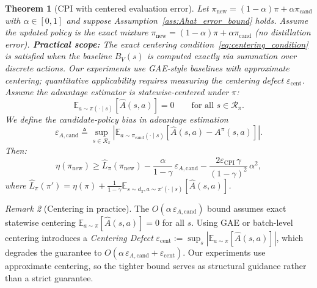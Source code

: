 \documentclass{article}
\theoremstyle{plain}
\newtheorem{theorem}{Theorem}[section]
\theoremstyle{definition}
\theoremstyle{remark}
\newtheorem{remark}[theorem]{Remark}
\newcommand{\E}{\mathbb{E}}
\begin{document}
\begin{theorem}[CPI with centered evaluation error]
\label{thm:monotone_with_error}
Let $\pi_{\mathrm{new}}=(1-\alpha)\pi+\alpha\pi_{\mathrm{cand}}$ with $\alpha\in[0,1]$ and suppose Assumption~\ref{ass:Ahat_error_bound} holds.
Assume the updated policy is the \emph{exact mixture} $\pi_{\mathrm{new}}=(1-\alpha)\pi+\alpha\pi_{\mathrm{cand}}$ (no distillation error).
\textbf{Practical scope:} The exact centering condition~\eqref{eq:centering_condition} is satisfied when the baseline $B_V(s)$ is computed exactly via summation over discrete actions. Our experiments use GAE-style baselines with approximate centering; quantitative applicability requires measuring the centering defect $\varepsilon_{\mathrm{cent}}$.
Assume the advantage estimator is \emph{statewise-centered under $\pi$}:
\begin{equation}
\E_{a\sim\pi(\cdot\mid s)}[\widehat A(s,a)] = 0
\qquad\text{for all } s\in\mathcal{R}_\pi.
\label{eq:centering_condition}
\end{equation}
We define the candidate-policy bias in advantage estimation
\begin{equation}
\varepsilon_{A,\mathrm{cand}}
\triangleq
\sup_{s \in \mathcal{R}_{\pi}}
\left|
\E_{a\sim\pi_{\mathrm{cand}}(\cdot\mid s)}\!\left[\widehat{A}(s,a)-A^\pi(s,a)\right]
\right|.
\label{eq:epsA0_def}
\end{equation}
Then:
\begin{equation}
\eta(\pi_{\mathrm{new}})
\ge
\widehat{L}_\pi(\pi_{\mathrm{new}})
-
\frac{\alpha}{1-\gamma}\,\varepsilon_{A,\mathrm{cand}}
-
\frac{2\varepsilon_{\mathrm{CPI}}\,\gamma}{(1-\gamma)^2}\,\alpha^2,
\label{eq:main_theorem}
\end{equation}
where $\widehat{L}_\pi(\pi') = \eta(\pi) + \frac{1}{1-\gamma}\E_{s\sim d_\pi, a\sim\pi'(\cdot\mid s)}[\widehat{A}(s,a)]$.
\end{theorem}

\begin{remark}[Centering in practice]
\label{rem:centering_practice}
The $O(\alpha\,\varepsilon_{A,\mathrm{cand}})$ bound assumes exact statewise centering $\E_{a\sim\pi}[\widehat{A}(s,a)] = 0$ for all $s$. Using GAE or batch-level centering introduces a \emph{Centering Defect} $\varepsilon_{\mathrm{cent}} := \sup_s |\E_{a\sim\pi}[\widehat{A}(s,a)]|$, which degrades the guarantee to $O(\alpha\,\varepsilon_{A,\mathrm{cand}} + \varepsilon_{\mathrm{cent}})$. Our experiments use approximate centering, so the tighter bound serves as structural guidance rather than a strict guarantee.
\end{remark}
\end{document}
